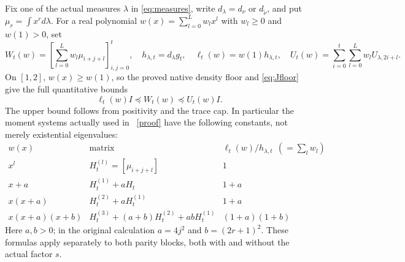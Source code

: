 \documentclass[11pt]{article}
\begin{document}
Fix one of the actual measures $\lambda$ in \eqref{eq:measures},
write $d_\lambda=d_\nu$ or $d_{\widetilde\nu}$, and put
$\mu_r=\int x^r d\lambda$. For a real polynomial
$w(x)=\sum_{l=0}^Lw_lx^l$ with $w_l\ge0$ and $w(1)>0$, set
\begin{equation}\label{eq:W}
 W_t(w)=\left[\sum_{l=0}^Lw_l\mu_{i+j+l}\right]_{i,j=0}^t,
 \quad h_{\lambda,t}=d_\lambda g_t,
 \quad \ell_t(w)=w(1)h_{\lambda,t},\quad
 U_t(w)=\sum_{i=0}^t\sum_{l=0}^Lw_lU_{\lambda,2i+l}.
\end{equation}
On $[1,2]$, $w(x)\ge w(1)$, so the proved native density floor
and \eqref{eq:Jfloor} give the full quantitative bounds
\begin{equation}\label{eq:Wfloor}
 \boxed{\ell_t(w)I\preceq W_t(w)\preceq U_t(w)I.}
\end{equation}
The upper bound follows from positivity and the trace cap. In
particular the moment systems actually used in \cite{FM}%
~\href{https://github.com/KokunoYumeto/zeta-function-research-reader/blob/5992ad50c0f2a06921f1fcaded7b4e38097c0739/workbenches/splitzero-tandem/continuations/20260920-original-kernel-mixed-determinants/providers/NATIVE_RESOLVENT_MOMENT_ENCLOSURES.tex\#L1}{[proof]}%
{} have
the following constants, not merely existential eigenvalues:
\[
\begin{array}{c|c|c}
 w(x)&\text{matrix}&\ell_t(w)/h_{\lambda,t}\ \ (=\sum_lw_l)\\ \hline
 x^l&H_t^{(l)}=[\mu_{i+j+l}]&1\\
 x+a&H_t^{(1)}+aH_t&1+a\\
 x(x+a)&H_t^{(2)}+aH_t^{(1)}&1+a\\
 x(x+a)(x+b)&H_t^{(3)}+(a+b)H_t^{(2)}+abH_t^{(1)}&(1+a)(1+b)
\end{array}
\]
Here $a,b>0$; in the original calculation $a=4j^2$ and
$b=(2r+1)^2$. These formulas apply separately to both parity
blocks, both with and without the actual factor $s$.
\end{document}
